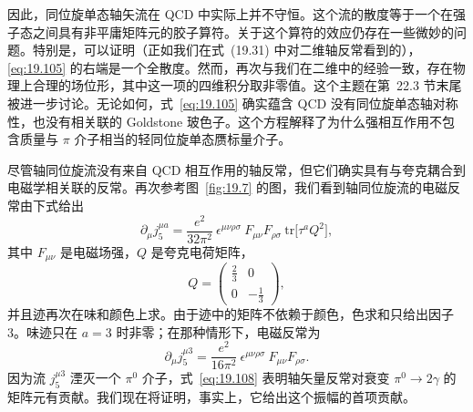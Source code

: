 因此，同位旋单态轴矢流在 QCD 中实际上并不守恒。这个流的散度等于一个在强子态之间具有非平庸矩阵元的胶子算符。关于这个算符的效应仍存在一些微妙的问题。特别是，可以证明（正如我们在式~(19.31) 中对二维轴反常看到的），\eqref{eq:19.105} 的右端是一个全散度。然而，再次与我们在二维中的经验一致，存在物理上合理的场位形，其中这一项的四维积分取非零值。这个主题在第~22.3 节末尾被进一步讨论。无论如何，式~\eqref{eq:19.105} 确实蕴含 QCD 没有同位旋单态轴对称性，也没有相关联的 Goldstone 玻色子。这个方程解释了为什么强相互作用不包含质量与 $\pi$ 介子相当的轻同位旋单态赝标量介子。

尽管轴同位旋流没有来自 QCD 相互作用的轴反常，但它们确实具有与夸克耦合到电磁学相关联的反常。再次参考图~\ref{fig:19.7} 的图，我们看到轴同位旋流的电磁反常由下式给出
\begin{equation}
  \partial_\mu j^{\mu a}_5 = \frac{e^2}{32\pi^2}\ \epsilon^{\mu\nu\rho\sigma}\
    F_{\mu\nu}F_{\rho\sigma}\ \mathrm{tr}\bigl[ \tau^a Q^2 \bigr] ,
  \label{eq:19.106}
\end{equation}
其中 $F_{\mu\nu}$ 是电磁场强，$Q$ 是夸克电荷矩阵，
\begin{equation}
  Q = \begin{pmatrix}\frac{2}{3}&0\\ 0&-\frac{1}{3}\end{pmatrix},
  \label{eq:19.107}
\end{equation}
并且迹再次在味和颜色上求。由于迹中的矩阵不依赖于颜色，色求和只给出因子 3。味迹只在 $a = 3$ 时非零；在那种情形下，电磁反常为
\begin{equation}
  \partial_\mu j^{\mu 3}_5 = \frac{e^2}{16\pi^2}\ \epsilon^{\mu\nu\rho\sigma}\
    F_{\mu\nu}F_{\rho\sigma} .
  \label{eq:19.108}
\end{equation}
因为流 $j^{\mu 3}_5$ 湮灭一个 $\pi^0$ 介子，式~\eqref{eq:19.108} 表明轴矢量反常对衰变 $\pi^0\to 2\gamma$ 的矩阵元有贡献。我们现在将证明，事实上，它给出这个振幅的首项贡献。

